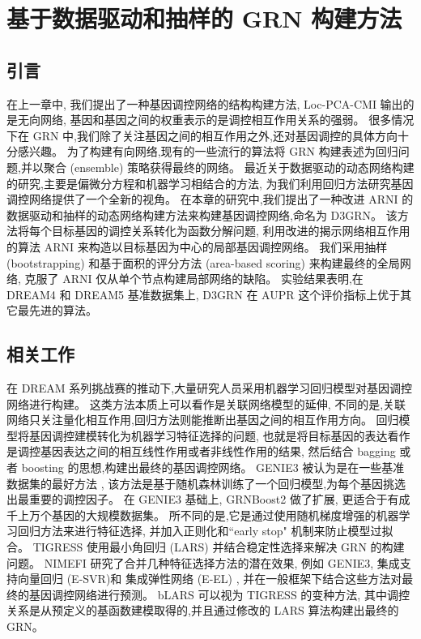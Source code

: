 \section{基于数据驱动和抽样的 GRN 构建方法}
\label{sec:d3grn}

\subsection{引言}

在上一章中, 我们提出了一种基因调控网络的结构构建方法,
Loc-PCA-CMI 输出的是无向网络, 基因和基因之间的权重表示的是调控相互作用关系的强弱。
很多情况下在 GRN 中,我们除了关注基因之间的相互作用之外,还对基因调控的具体方向十分感兴趣。
为了构建有向网络,现有的一些流行的算法将 GRN 构建表述为回归问题,并以聚合 (ensemble) 策略获得最终的网络。
最近关于数据驱动的动态网络构建的研究,主要是偏微分方程和机器学习相结合的方法, 
为我们利用回归方法研究基因调控网络提供了一个全新的视角。
在本章的研究中,我们提出了一种改进 ARNI 的数据驱动和抽样的动态网络构建方法来构建基因调控网络,命名为 D3GRN。
该方法将每个目标基因的调控关系转化为函数分解问题,
利用改进的揭示网络相互作用的算法 ARNI 来构造以目标基因为中心的局部基因调控网络。
我们采用抽样 (bootstrapping) 和基于面积的评分方法 (area-based scoring) 来构建最终的全局网络,
克服了 ARNI 仅从单个节点构建局部网络的缺陷。
实验结果表明,在 DREAM4 和 DREAM5 基准数据集上, D3GRN 在 AUPR 这个评价指标上优于其它最先进的算法。

\subsection{相关工作}

在 DREAM 系列挑战赛的推动下,大量研究人员采用机器学习回归模型对基因调控网络进行构建。
这类方法本质上可以看作是关联网络模型的延伸,
不同的是,关联网络只关注量化相互作用,回归方法则能推断出基因之间的相互作用方向。
回归模型将基因调控建模转化为机器学习特征选择的问题,
也就是将目标基因的表达看作是调控基因表达之间的相互线性作用或者非线性作用的结果,
然后结合 bagging 或者 boosting 的思想,构建出最终的基因调控网络。
GENIE3 \cite{huynh2010inferring} 被认为是在一些基准数据集的最好方法 \cite{marbach2010revealing},
该方法是基于随机森林训练了一个回归模型,为每个基因挑选出最重要的调控因子。
在 GENIE3 基础上, GRNBoost2 \cite{moerman2019grnboost2} 做了扩展, 更适合于有成千上万个基因的大规模数据集。
所不同的是,它是通过使用随机梯度增强的机器学习回归方法来进行特征选择, 
并加入正则化和``early stop" 机制来防止模型过拟合。 
TIGRESS \cite{Haury2012} 使用最小角回归 (LARS) 并结合稳定性选择来解决 GRN 的构建问题。
NIMEFI \cite{ruyssinck2014nimefi} 研究了合并几种特征选择方法的潜在效果,
例如 GENIE3, 集成支持向量回归 (E-SVR)和 集成弹性网络 (E-EL) \cite{zou2005regularization},
并在一般框架下结合这些方法对最终的基因调控网络进行预测。
bLARS \cite{singh2016blars} 可以视为 TIGRESS 的变种方法,
其中调控关系是从预定义的基函数建模取得的,并且通过修改的 LARS 算法构建出最终的 GRN。

